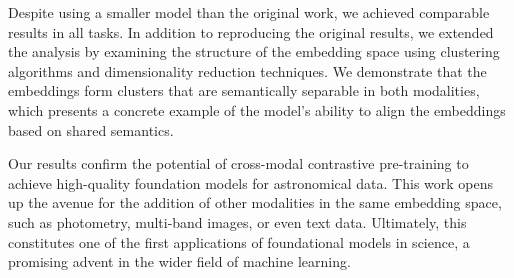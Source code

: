 \documentclass[draft, a4paper,12pt]{article}
\begin{document}
Despite using a smaller model than the original work, we achieved comparable results in all tasks. In addition to reproducing the original results, we extended the analysis by examining the structure of the embedding space using clustering algorithms and dimensionality reduction techniques. We demonstrate that the embeddings form clusters that are semantically separable in both modalities, which presents a concrete example of the model's ability to align the embeddings based on shared semantics. 


Our results confirm the potential of cross-modal contrastive pre-training to achieve high-quality foundation models for astronomical data. This work opens up the avenue for the addition of other modalities in the same embedding space, such as photometry, multi-band images, or even text data. Ultimately, this constitutes one of the first applications of foundational models in science, a promising advent in the wider field of machine learning.





\newpage


\end{document}
